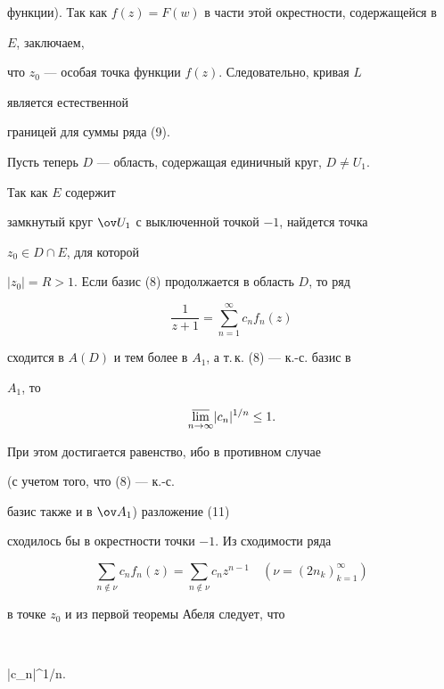 функции). Так как $f(z)=F(w)$ в части этой окрестности, содержащейся в 


$E$, заключаем, 


что $z_0$ --- особая точка функции $f(z)$. Следовательно, кривая $L$ 


является естественной 


границей для суммы ряда (9). 


 


Пусть теперь $D$ --- область, содержащая единичный круг, $D\ne U_1$. 


Так как $E$ содержит 


замкнутый круг $\ov U_1$ с выключенной точкой $-1$, найдется точка 


$z_0\in D\cap E$, для которой 


$|z_0|=R>1$. Если базис (8) продолжается в область $D$, то ряд 


\begin{equation} 


\frac{1}{z+1}=\sum^\infty_{n=1}c_n f_n(z) 


\end{equation} 


сходится в $A(D)$ и тем более в $A_1$, а т.\,к. (8) --- к.-с. базис в 


$A_1$, то 


$$ 


\underset{n\to\infty}{\varlimsup}{}|c_n|^{1/n}\le 1. 


$$ 


При этом достигается равенство, ибо в противном случае 


(с учетом того, что (8) --- к.-с. 


базис также и в $\ov A_1$) разложение (11) 


сходилось бы в окрестности точки $-1$. Из сходимости ряда 


\begin{equation} 


\sum_{n\notin\nu}c_n f_n(z)= 


\sum_{n\notin\nu}c_n z^{n-1}\quad 


(\nu=(2n_k)^\infty_{k=1}) 


\end{equation} 


в точке $z_0$ и из первой теоремы Абеля следует, что 


$$ 


|c_n|^{1/n}\le{}. 


